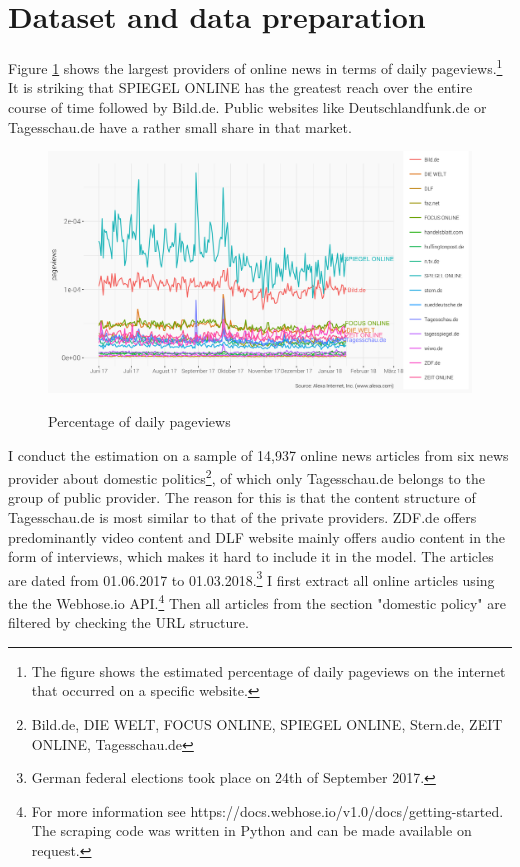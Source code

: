 \documentclass[12pt,a4paper,notitlepage]{article}
\begin{document}
\section{Dataset and data preparation}\label{ch_data}

Figure \ref{fig_reach} shows the largest providers of online news in terms of daily pageviews.\footnote{The figure shows the estimated percentage of daily pageviews on the internet that occurred on a specific website.} It is striking that SPIEGEL ONLINE has the greatest reach over the entire course of time followed by Bild.de. Public websites like Deutschlandfunk.de or Tagesschau.de have a rather small share in that market. 

\begin{figure}[H]
	\caption{Percentage of daily pageviews}
	\includegraphics[width=\textwidth]{../figs/reach.png}
	\label{fig_reach}
\end{figure}

I conduct the estimation on a sample of 14,937 online news articles from six news provider about domestic politics\footnote{Bild.de, DIE WELT, FOCUS ONLINE, SPIEGEL ONLINE, Stern.de, ZEIT ONLINE, Tagesschau.de}, of which only Tagesschau.de belongs to the group of public provider. The reason for this is that the content structure of Tagesschau.de is most similar to that of the private providers. ZDF.de offers predominantly video content and DLF website mainly offers audio content in the form of interviews, which makes it hard to include it in the model. The articles are dated from 01.06.2017 to 01.03.2018.\footnote{German federal elections took place on 24th of September 2017.} I first extract all online articles using the the Webhose.io API.\footnote{For more information see https://docs.webhose.io/v1.0/docs/getting-started. The scraping code was written in Python and can be made available on request.} Then all articles from the section "domestic policy" are filtered by checking the URL structure.
\end{document}
